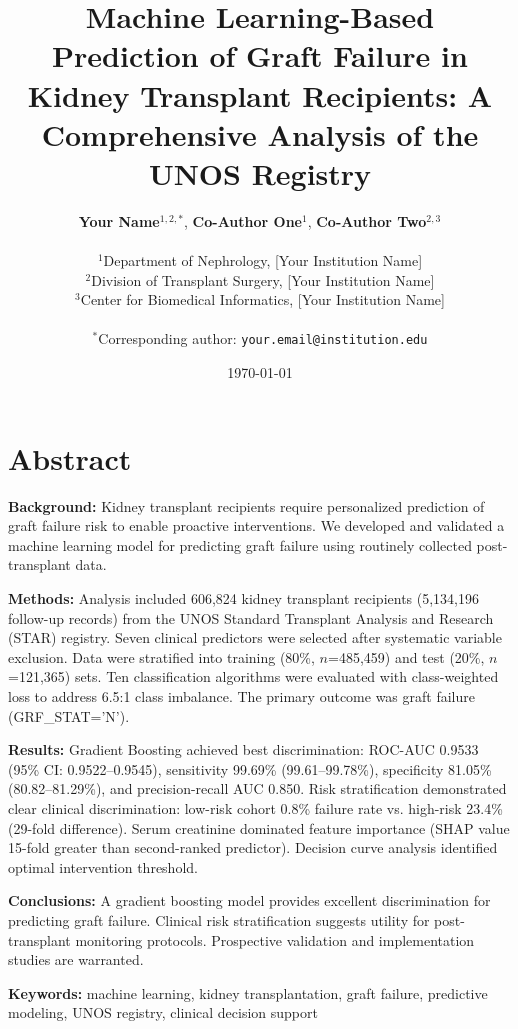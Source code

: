 \documentclass[11pt,a4paper]{article}
\title{\Large Machine Learning-Based Prediction of Graft Failure in Kidney Transplant Recipients: A Comprehensive Analysis of the UNOS Registry}
\author{%
\textbf{Your Name}$^{1,2,*}$, 
\textbf{Co-Author One}$^{1}$, 
\textbf{Co-Author Two}$^{2,3}$ \\
\\
$^{1}$Department of Nephrology, [Your Institution Name] \\
$^{2}$Division of Transplant Surgery, [Your Institution Name] \\
$^{3}$Center for Biomedical Informatics, [Your Institution Name] \\
\\
$^{*}$Corresponding author: \texttt{your.email@institution.edu}
}
\date{\today}
\begin{document}
\maketitle

\section*{Abstract}

\noindent\textbf{Background:} Kidney transplant recipients require personalized prediction of graft failure risk to enable proactive interventions. We developed and validated a machine learning model for predicting graft failure using routinely collected post-transplant data.

\noindent\textbf{Methods:} Analysis included 606,824 kidney transplant recipients (5,134,196 follow-up records) from the UNOS Standard Transplant Analysis and Research (STAR) registry. Seven clinical predictors were selected after systematic variable exclusion. Data were stratified into training (80\%, $n$=485,459) and test (20\%, $n$=121,365) sets. Ten classification algorithms were evaluated with class-weighted loss to address 6.5:1 class imbalance. The primary outcome was graft failure (GRF\_STAT='N').

\noindent\textbf{Results:} Gradient Boosting achieved best discrimination: ROC-AUC 0.9533 (95\% CI: 0.9522–0.9545), sensitivity 99.69\% (99.61–99.78\%), specificity 81.05\% (80.82–81.29\%), and precision-recall AUC 0.850. Risk stratification demonstrated clear clinical discrimination: low-risk cohort 0.8\% failure rate vs. high-risk 23.4\% (29-fold difference). Serum creatinine dominated feature importance (SHAP value 15-fold greater than second-ranked predictor). Decision curve analysis identified optimal intervention threshold.

\noindent\textbf{Conclusions:} A gradient boosting model provides excellent discrimination for predicting graft failure. Clinical risk stratification suggests utility for post-transplant monitoring protocols. Prospective validation and implementation studies are warranted.

\noindent\textbf{Keywords:} machine learning, kidney transplantation, graft failure, predictive modeling, UNOS registry, clinical decision support

\end{document}
